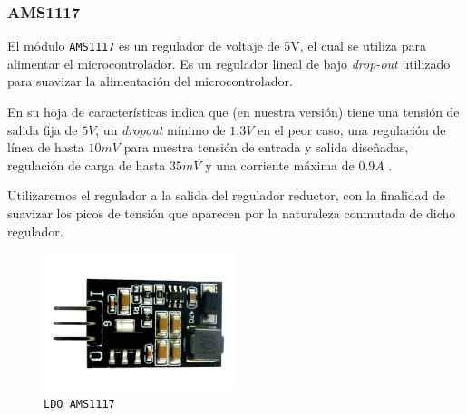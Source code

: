 \subsubsection{AMS1117}

El módulo \texttt{AMS1117} es un regulador de voltaje de 5V, el cual se utiliza para alimentar el microcontrolador. Es un regulador lineal de bajo \textit{drop-out} utilizado para suavizar la alimentación del microcontrolador. 

En su hoja de características indica que (en nuestra versión) tiene una tensión de salida fija de $5 V$, un \textit{dropout} mínimo de $1.3 V$ en el peor caso, una regulación de línea de hasta $10 mV$ para nuestra tensión de entrada y salida diseñadas, regulación de carga de hasta $35 mV$ y una corriente máxima de $0.9 A$ \cite{advancedmonolithicsystemsAMS1117}.

Utilizaremos el regulador a la salida del regulador reductor, con la finalidad de suavizar los picos de tensión que aparecen por la naturaleza conmutada de dicho regulador.

\begin{figure}[h]
    \centering
    \includegraphics[width=0.5\textwidth]{images/2-hardware/componentes/AMS1117.png}
    \caption{\texttt{LDO AMS1117}}
    \label{fig:hardware/modulos/ldo-ams1117}
\end{figure}

